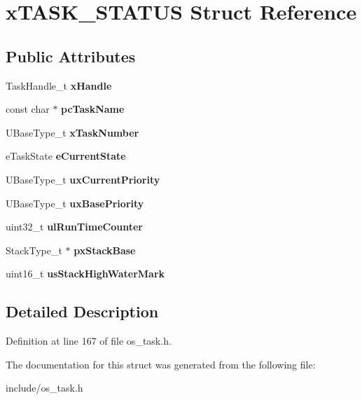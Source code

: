 \hypertarget{structxTASK__STATUS}{}\section{x\+T\+A\+S\+K\+\_\+\+S\+T\+A\+T\+US Struct Reference}
\label{structxTASK__STATUS}
\subsection*{Public Attributes}
\begin{DoxyCompactItemize}
\item 
\mbox{\label{structxTASK__STATUS_ac57f825f365c3c64bba827285fe3c2a0}} 
Task\+Handle\+\_\+t {\bfseries x\+Handle}
\item 
\mbox{\label{structxTASK__STATUS_ad272663e2560bd9ea088384a39ba6192}} 
const char $\ast$ {\bfseries pc\+Task\+Name}
\item 
\mbox{\label{structxTASK__STATUS_acd44468ba37270b04f83d0833c098057}} 
U\+Base\+Type\+\_\+t {\bfseries x\+Task\+Number}
\item 
\mbox{\label{structxTASK__STATUS_a727e904e3afe49472b0fc6a4e96439cb}} 
e\+Task\+State {\bfseries e\+Current\+State}
\item 
\mbox{\label{structxTASK__STATUS_a39df647234fc0d6de5852042a2741a94}} 
U\+Base\+Type\+\_\+t {\bfseries ux\+Current\+Priority}
\item 
\mbox{\label{structxTASK__STATUS_a692f4c8957b7270f1579cdee63ff287e}} 
U\+Base\+Type\+\_\+t {\bfseries ux\+Base\+Priority}
\item 
\mbox{\label{structxTASK__STATUS_a92ab83f4f376c255dedf8e06a78261f7}} 
uint32\+\_\+t {\bfseries ul\+Run\+Time\+Counter}
\item 
\mbox{\label{structxTASK__STATUS_a0ee59674d2cc57d3a5a29c777d5452ed}} 
Stack\+Type\+\_\+t $\ast$ {\bfseries px\+Stack\+Base}
\item 
\mbox{\label{structxTASK__STATUS_a284892acd41bff7c319295687a95af6b}} 
uint16\+\_\+t {\bfseries us\+Stack\+High\+Water\+Mark}
\end{DoxyCompactItemize}


\subsection{Detailed Description}


Definition at line 167 of file os\+\_\+task.\+h.



The documentation for this struct was generated from the following file\+:\begin{DoxyCompactItemize}
\item 
include/os\+\_\+task.\+h\end{DoxyCompactItemize}
